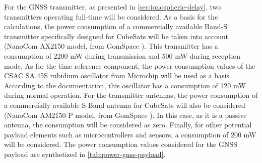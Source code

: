
For the GNSS transmitter, as presented in \autoref{sec:ionospheric-delay}, two transmitters operating full-time will be considered. As a basis for the calculations, the power consumption of a commercially available Band-S transmitter specifically designed for CubeSats will be taken into account (NanoCom AX2150 model, from GomSpace \cite{ax2150}). This transmitter has a consumption of 2200 mW during transmission and 500 mW during reception mode. As for the time reference component, the power consumption values of the CSAC SA.45S rubidium oscillator from Microchip will be used as a basis. According to the documentation, this oscillator has a consumption of 120 mW during normal operation. For the transmitter antennas, the power consumption of a commercially available S-Band antenna for CubeSats will also be considered (NanoCom AM2150-P model, from GomSpace \cite{am2150-p}). In this case, as it is a passive antenna, the consumption will be considered as zero. Finally, for other potential payload elements such as microcontrollers and sensors, a consumption of 200 mW will be considered. The power consumption values considered for the GNSS payload are synthetized in \autoref{tab:power-gnss-payload}.

